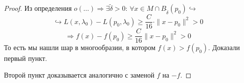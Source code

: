 \begin{proof}
    Из определения $o(\dots) \Rightarrow \exists \widetilde{\delta} > 0$: $\forall x \in M \cap B_{\widetilde{\delta}}(p_0) \hookrightarrow $ \\
    \[\hookrightarrow L(x, \lambda_0) - L(p_0, \lambda_0) \geq \frac{C}{16}\cdot \|x - p_0\|^2 > 0\]
    \[\Rightarrow f(x) - f(p_0) \geq \frac{C}{16}\|x - p_0\|^2 > 0\]
    То есть мы нашли шар в многообразии, в котором $f(x) > f(p_0)$. Доказали первый пункт.

    Второй пункт доказывается аналогично с заменой $f$ на $-f$.
\end{proof}






